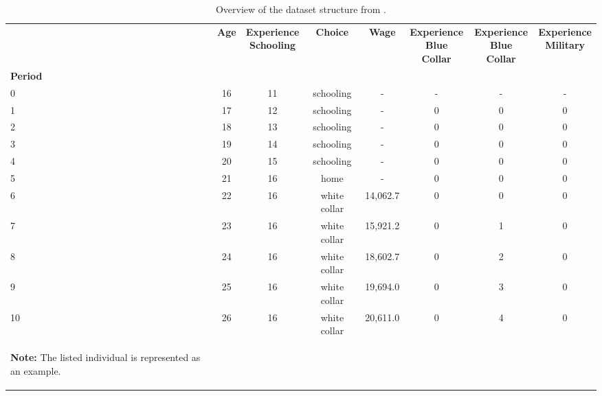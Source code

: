 \begin{ThreePartTable}

	\begin{longtable}{@{}lccccccc@{}}
		\caption{Overview of the dataset structure from \citet{Keane.1997}.}
		\label{tab:BasicDataStructure}
		
		\setlength\extrarowheight{2.5pt}
		
		\\
		\toprule
       & \textbf{Age}    & \thead{\textbf{Experience}\\ \textbf{Schooling}}  & \textbf{Choice} & \textbf{Wage} & \thead{\textbf{Experience}\\ \textbf{Blue Collar}} & \thead{\textbf{Experience}\\ \textbf{Blue Collar}} & \thead{\textbf{Experience}\\ \textbf{Military}}   \\
\textbf{Period} &        &            &        &      &             &               &       \\ \midrule
		\endfirsthead
		
0  & 16 & 11 & schooling    & - & - & - & -\\
1  & 17 & 12 & schooling    & - & 0 & 0 & 0\\
2  & 18 & 13 & schooling    & - & 0 & 0 & 0\\
3  & 19 & 14 & schooling    & - & 0 & 0 & 0\\
4  & 20 & 15 & schooling    & - & 0 & 0 & 0\\
5  & 21 & 16 & home         & - & 0 & 0 & 0\\
6  & 22 & 16 & white collar & 14,062.7 & 0 & 0 & 0\\
7  & 23 & 16 & white collar & 15,921.2 & 0 & 1 & 0\\
8  & 24 & 16 & white collar & 18,602.7 & 0 & 2 & 0\\
9  & 25 & 16 & white collar & 19,694.0 & 0 & 3 & 0\\
10 & 26 & 16 & white collar & 20,611.0 & 0 & 4 & 0\\
  \bottomrule
	\begin{TableNotes}
		\item \textbf{Note:} The listed individual is represented as an example. 
	\end{TableNotes}		
	\end{longtable}
\end{ThreePartTable}